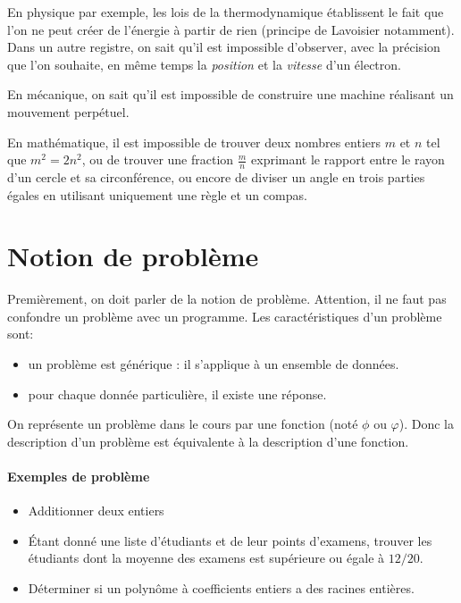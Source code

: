 En physique par exemple, les lois de la thermodynamique établissent le fait que l'on ne peut créer de l'énergie à partir de rien (principe de Lavoisier notamment). Dans un autre registre, on sait qu'il est impossible d'observer, avec la précision que l'on souhaite, en même temps la \textit{position} et la \textit{vitesse} d'un électron.

En mécanique, on sait qu'il est impossible de construire une machine réalisant un mouvement perpétuel.

En mathématique, il est impossible de trouver deux nombres entiers $m$ et $n$ tel que $m^2 = 2n^2$, ou de trouver une fraction $\frac{m}{n}$ exprimant le rapport entre le rayon d'un cercle et sa circonférence, ou encore de diviser un angle en trois parties égales en utilisant uniquement une règle et un compas.

\section{Notion de problème}
\label{sec:notion_de_probleme}

Premièrement, on doit parler de la notion de problème.
Attention, il ne faut pas confondre un problème avec un programme.
Les caractéristiques d'un problème sont:

\begin{itemize}
	\item un problème est générique : il s'applique à un ensemble de données.
	\item pour chaque donnée particulière, il existe une réponse.
\end{itemize}

On représente un problème dans le cours par une fonction (noté $\phi$ ou $\varphi$).
Donc la description d'un problème est équivalente à la description d'une fonction.

\paragraph{Exemples de problème}
\begin{itemize}
	\item Additionner deux entiers
	\item Étant donné une liste d'étudiants et de leur points d'examens, trouver les étudiants dont la moyenne des examens est supérieure ou égale à $12/20$.
	\item Déterminer si un polynôme à coefficients entiers a des racines entières.
\end{itemize}

